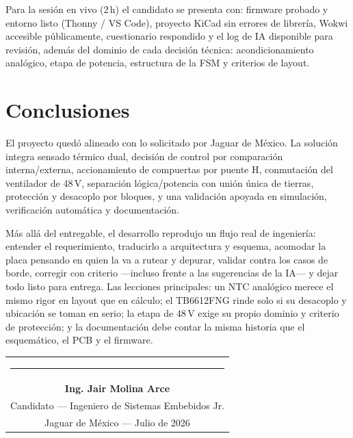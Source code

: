 \documentclass[11pt,letterpaper]{article}
\begin{document}
Para la sesión en vivo (2\,h) el candidato se presenta con: firmware probado y entorno
listo (Thonny / VS Code), proyecto KiCad sin errores de librería, Wokwi accesible
públicamente, cuestionario respondido y el log de IA disponible para revisión, además
del dominio de cada decisión técnica: acondicionamiento analógico, etapa de potencia,
estructura de la FSM y criterios de layout.

\section{Conclusiones}
El proyecto quedó alineado con lo solicitado por Jaguar de México. La solución integra
sensado térmico dual, decisión de control por comparación interna/externa, accionamiento
de compuertas por puente H, conmutación del ventilador de 48\,V, separación
lógica/potencia con unión única de tierras, protección y desacoplo por bloques, y una
validación apoyada en simulación, verificación automática y documentación.

Más allá del entregable, el desarrollo reprodujo un flujo real de ingeniería: entender
el requerimiento, traducirlo a arquitectura y esquema, acomodar la placa pensando en
quien la va a rutear y depurar, validar contra los casos de borde, corregir con criterio
---incluso frente a las sugerencias de la IA--- y dejar todo listo para entrega. Las
lecciones principales: un NTC analógico merece el mismo rigor en layout que en cálculo;
el TB6612FNG rinde solo si su desacoplo y ubicación se toman en serio; la etapa de 48\,V
exige su propio dominio y criterio de protección; y la documentación debe contar la
misma historia que el esquemático, el PCB y el firmware.

\vspace{1.2cm}
\begin{flushright}
\begin{tabular}{c}
\rule{6cm}{0.4pt}\\
\textbf{Ing. Jair Molina Arce}\\
Candidato --- Ingeniero de Sistemas Embebidos Jr.\\
Jaguar de México --- Julio de 2026
\end{tabular}
\end{flushright}
\end{document}
